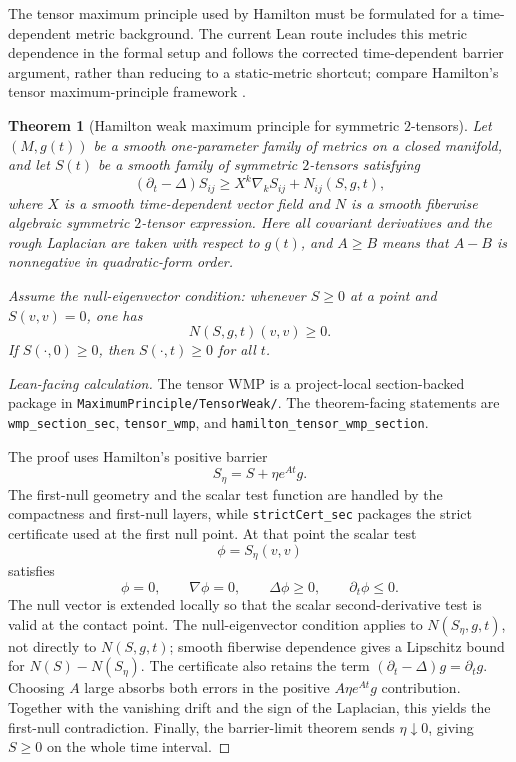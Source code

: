 \documentclass[11pt]{article}
\theoremstyle{plain}
\newtheorem{theorem}{Theorem}[section]
\theoremstyle{definition}
\theoremstyle{remark}
\newcommand{\leanref}[1]{\nolinkurl{#1}}
\newcommand{\leanfile}[1]{\nolinkurl{#1}}
\newcommand{\rfdir}[1]{\leanfile{#1/}}
\begin{document}
The tensor maximum principle used by Hamilton must be formulated for a
time-dependent metric background.  The current Lean route includes this
metric dependence in the formal setup and follows the corrected
time-dependent barrier argument, rather than reducing to a static-metric
shortcut; compare Hamilton's tensor maximum-principle framework
\cite{MR862046}.

\begin{theorem}[Hamilton weak maximum principle for symmetric $2$-tensors]
\label{thm:hamilton-tensor-wmp}
Let $(M,g(t))$ be a smooth one-parameter family of metrics on a closed
manifold, and let $S(t)$ be a smooth family of symmetric $2$-tensors satisfying
\[
(\partial_t-\Delta)S_{ij}
\ge
X^k\nabla_kS_{ij}+N_{ij}(S,g,t),
\]
where $X$ is a smooth time-dependent vector field and $N$ is a smooth
fiberwise algebraic symmetric $2$-tensor expression.
Here all covariant derivatives and the rough Laplacian are taken with respect
to \(g(t)\), and \(A\ge B\) means that \(A-B\) is nonnegative in
quadratic-form order.

Assume the null-eigenvector condition: whenever $S\ge0$ at a point and
$S(v,v)=0$, one has
\[
N(S,g,t)(v,v)\ge0.
\]
If $S(\cdot,0)\ge0$, then $S(\cdot,t)\ge0$ for all $t$.
\end{theorem}

\begin{proof}[Lean-facing calculation]
The tensor WMP is a project-local section-backed package in
\rfdir{MaximumPrinciple/TensorWeak}.  The theorem-facing statements are
\leanref{wmp_section_sec}, \leanref{tensor_wmp}, and
\leanref{hamilton_tensor_wmp_section}.

The proof uses Hamilton's positive barrier
\[
  S_\eta=S+\eta e^{At}g.
\]
The first-null geometry and the scalar test function are handled by the
compactness and first-null layers, while \leanref{strictCert_sec} packages the
strict certificate used at the first null point.  At that point the scalar test
\[
  \phi=S_\eta(v,v)
\]
satisfies
\[
  \phi=0,
  \qquad
  \nabla\phi=0,
  \qquad
  \Delta\phi\ge0,
  \qquad
  \partial_t\phi\le0.
\]
The null vector is extended locally so that the scalar second-derivative test
is valid at the contact point.  The null-eigenvector condition applies to
$N(S_\eta,g,t)$, not directly to $N(S,g,t)$; smooth fiberwise dependence gives
a Lipschitz bound for $N(S)-N(S_\eta)$.  The certificate also retains the term
$(\partial_t-\Delta)g=\partial_tg$.  Choosing $A$ large absorbs both errors in
the positive $A\eta e^{At}g$ contribution.  Together with the vanishing drift
and the sign of the Laplacian, this yields the first-null contradiction.
Finally, the barrier-limit theorem sends $\eta\downarrow0$, giving $S\ge0$ on
the whole time interval.
\end{proof}
\end{document}
